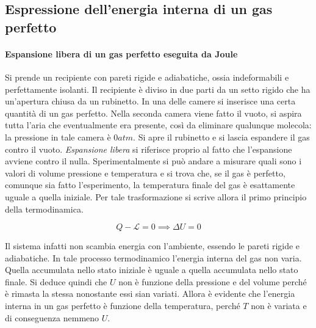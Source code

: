 \subsection{Espressione dell'energia interna di un gas perfetto}

\paragraph{Espansione libera di un gas perfetto eseguita da Joule} Si prende un recipiente con pareti rigide e adiabatiche, ossia indeformabili e perfettamente isolanti. Il recipiente è diviso in due parti da un setto rigido che ha un'apertura chiusa da un rubinetto. In una delle camere si inserisce una certa quantità di un gas perfetto.
Nella seconda camera viene fatto il vuoto, si aspira tutta l'aria che eventualmente era presente, così da eliminare qualunque molecola: la pressione in tale camera è $0 atm$. Si apre il rubinetto e si lascia espandere il gas contro il vuoto. \emph{Espansione libera} si riferisce proprio al fatto che l'espansione avviene contro il nulla. Sperimentalmente si può andare a misurare quali sono i valori di volume pressione e temperatura e si trova che, se il gas è perfetto, comunque sia fatto l'esperimento, la temperatura finale del gas è esattamente uguale a quella iniziale. Per tale trasformazione si scrive allora il primo principio della termodinamica.

\[
	Q-\mathcal{L}=0 \implies \Delta U=0
\]

Il sistema infatti non scambia energia con l'ambiente, essendo le pareti rigide e adiabatiche. In tale processo termodinamico l'energia interna del gas non varia. Quella accumulata nello stato iniziale è uguale a quella accumulata nello stato finale. Si deduce quindi che $U$ non è funzione della pressione e del volume perché è rimasta la stessa nonostante essi sian variati. Allora è evidente che l'energia interna in un gas perfetto è funzione della temperatura, perché $T$ non è variata e di conseguenza nemmeno $U$.


